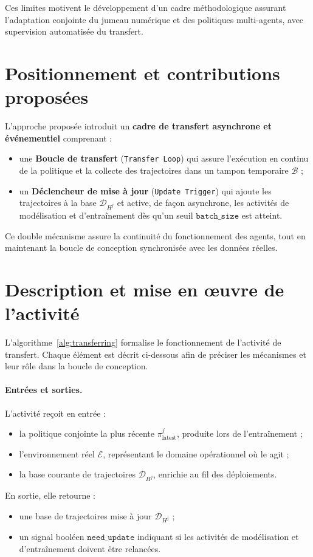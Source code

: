 Ces limites motivent le développement d’un cadre méthodologique assurant l’adaptation conjointe du jumeau numérique et des politiques multi-agents, avec supervision automatisée du transfert.

\section{Positionnement et contributions proposées}

L’approche proposée introduit un \textbf{cadre de transfert asynchrone et événementiel} comprenant :
\begin{itemize}
    \item une \textbf{Boucle de transfert} (\texttt{Transfer Loop}) qui assure l’exécution en continu de la politique et la collecte des trajectoires dans un tampon temporaire $\mathcal{B}$ ;
    \item un \textbf{Déclencheur de mise à jour} (\texttt{Update Trigger}) qui ajoute les trajectoires à la base $\mathcal{D}_{H^j}$ et active, de façon asynchrone, les activités de modélisation et d’entraînement dès qu’un seuil $\texttt{batch\_size}$ est atteint.
\end{itemize}

Ce double mécanisme assure la continuité du fonctionnement des agents, tout en maintenant la boucle de conception synchronisée avec les données réelles.

\section{Description et mise en œuvre de l’activité}

L’algorithme~\ref{alg:transferring} formalise le fonctionnement de l’activité de transfert.
Chaque élément est décrit ci-dessous afin de préciser les mécanismes et leur rôle dans la boucle de conception.

\paragraph{Entrées et sorties.}
L’activité reçoit en entrée :
\begin{itemize}
    \item la politique conjointe la plus récente $\pi^j_{\text{latest}}$, produite lors de l’entraînement ;
    \item l’environnement réel $\mathcal{E}$, représentant le domaine opérationnel où le  agit ;
    \item la base courante de trajectoires $\mathcal{D}_{H^j}$, enrichie au fil des déploiements.
\end{itemize}
En sortie, elle retourne :
\begin{itemize}
    \item une base de trajectoires mise à jour $\mathcal{D}_{H^j}$ ;
    \item un signal booléen $\texttt{need\_update}$ indiquant si les activités de modélisation et d’entraînement doivent être relancées.
\end{itemize}

